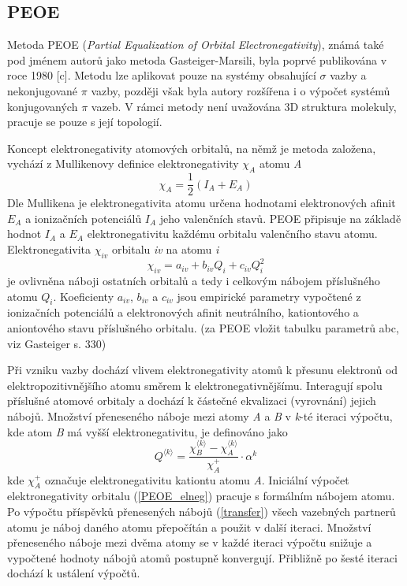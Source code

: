 \subsection{PEOE}
Metoda PEOE (\textit{Partial Equalization of Orbital Electronegativity}), známá také pod jménem autorů jako metoda Gasteiger-Marsili, byla poprvé publikována v roce 1980 [c]. Metodu lze aplikovat pouze na systémy obsahující $\sigma$ vazby a nekonjugované $\pi$  vazby, později však byla autory rozšířena i o výpočet systémů konjugovaných $\pi$ vazeb. V rámci metody není uvažována 3D struktura molekuly, pracuje se pouze s její topologií. 

Koncept elektronegativity atomových orbitalů, na němž je metoda založena, vychází z Mullikenovy definice elektronegativity $\chi_A$ atomu \textit{A}
\begin{equation}
    \chi_A = \frac{1}{2}(I_A + E_A)
\end{equation}
Dle Mullikena je elektronegativita atomu určena hodnotami elektronových afinit $ E_A$ a ionizačních potenciálů $I_A$ jeho valenčních stavů. PEOE připisuje na základě hodnot $I_A$ a $ E_A$ elektronegativitu každému orbitalu valenčního stavu atomu. Elektronegativita $\chi_{iv}$ orbitalu \textit{iv} na atomu \textit{i}
\begin{equation}
\label{PEOE_elneg}
    \chi_{iv} = a_{iv} + b_{iv}Q_i + c_{iv}Q_i^2
\end{equation}
je ovlivněna náboji ostatních orbitalů a tedy i celkovým nábojem příslušného atomu $Q_i$. Koeficienty $a_{iv}$, $b_{iv}$ a $c_{iv}$ jsou empirické parametry vypočtené z ionizačních potenciálů a elektronových afinit neutrálního, kationtového a aniontového stavu příslušného orbitalu. (za PEOE vložit tabulku parametrů abc, viz Gasteiger s. 330)

Při vzniku vazby dochází vlivem elektronegativity atomů k přesunu elektronů od elektropozitivnějšího atomu směrem k elektronegativnějšímu. Interagují spolu přísluš\-né atomové orbitaly a dochází k částečné ekvalizaci (vyrovnání) jejich nábojů. Množ\-ství přeneseného náboje mezi atomy \textit{A} a \textit{B} v \textit{k}-té iteraci výpočtu, kde atom \textit{B} má vyšší elektronegativitu, je definováno jako 
\begin{equation}
\label{transfer}
    Q^{\langle k \rangle} = \frac{\chi_B^{\langle k \rangle} - \chi_A^{\langle k \rangle}}{\chi_A^+} \cdot \alpha^k
\end{equation}
kde $\chi_A^+$ označuje elektronegativitu kationtu atomu \textit{A}. Iniciální výpočet elektronegativity orbitalu (\ref{PEOE_elneg}) pracuje s formálním nábojem atomu. Po výpočtu příspěvků přenesených nábojů (\ref{transfer}) všech vazebných partnerů atomu je náboj daného atomu přepočítán a použit v další iteraci. Množství přeneseného náboje mezi dvěma atomy se v každé iteraci výpočtu snižuje a vypočtené hodnoty nábojů atomů postupně konvergují. Přibližně po šesté iteraci dochází k ustálení výpočtů. 


